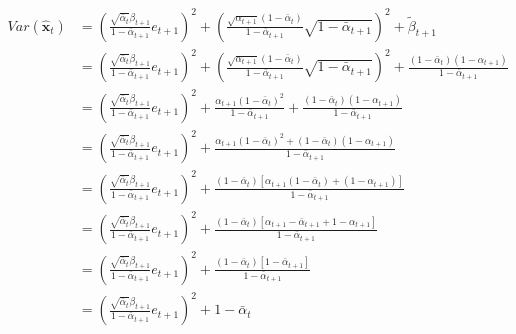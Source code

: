 \documentclass{article} \usepackage{iclr2024_conference,times}
\begin{document}
\begin{align}
Var(\hat{\pmb{x}}_{t}) & = (\frac{\sqrt{\bar{\alpha}_{t}} \beta_{t+1}}{1-\bar{\alpha}_{t+1}} e_{t+1} )^2 + (\frac{\sqrt{\alpha_{t+1}}(1-\bar{\alpha}_{t})}{1-\bar{\alpha}_{t+1}} \sqrt{1 -\bar{\alpha}_{t+1}} )^2 + \tilde{\beta}_{t+1} \label{eq40} \\
& = (\frac{\sqrt{\bar{\alpha}_{t}} \beta_{t+1}}{1-\bar{\alpha}_{t+1}} e_{t+1} )^2 + (\frac{\sqrt{\alpha_{t+1}}(1-\bar{\alpha}_{t})}{1-\bar{\alpha}_{t+1}} \sqrt{1 -\bar{\alpha}_{t+1}} )^2 + \frac{(1-\bar{\alpha}_{t})(1-\alpha_{t+1})} {1-\bar{\alpha}_{t+1}} \nonumber \\
& = (\frac{\sqrt{\bar{\alpha}_{t}} \beta_{t+1}}{1-\bar{\alpha}_{t+1}} e_{t+1} )^2 + \frac{\alpha_{t+1}(1-\bar{\alpha}_{t})^2}{1-\bar{\alpha}_{t+1}} + \frac{(1-\bar{\alpha}_{t})(1-\alpha_{t+1})} {1-\bar{\alpha}_{t+1}} \nonumber \\
& = (\frac{\sqrt{\bar{\alpha}_{t}} \beta_{t+1}}{1-\bar{\alpha}_{t+1}} e_{t+1} )^2 + \frac{\alpha_{t+1}(1-\bar{\alpha}_{t})^2 + (1-\bar{\alpha}_{t})(1-\alpha_{t+1})} {1-\bar{\alpha}_{t+1}} \nonumber \\
& = (\frac{\sqrt{\bar{\alpha}_{t}} \beta_{t+1}}{1-\bar{\alpha}_{t+1}} e_{t+1} )^2 + \frac{(1-\bar{\alpha}_{t})[\alpha_{t+1}(1-\bar{\alpha}_{t}) + (1-\alpha_{t+1})]} {1-\bar{\alpha}_{t+1}} \nonumber \\
& = (\frac{\sqrt{\bar{\alpha}_{t}} \beta_{t+1}}{1-\bar{\alpha}_{t+1}} e_{t+1} )^2 + \frac{(1-\bar{\alpha}_{t})[\alpha_{t+1} - \bar{\alpha}_{t+1} + 1-\alpha_{t+1}]} {1-\bar{\alpha}_{t+1}} \nonumber \\
& = (\frac{\sqrt{\bar{\alpha}_{t}} \beta_{t+1}}{1-\bar{\alpha}_{t+1}} e_{t+1} )^2 + \frac{(1-\bar{\alpha}_{t})[1-\bar{\alpha}_{t+1}]} {1-\bar{\alpha}_{t+1}} \nonumber \\
& = (\frac{\sqrt{\bar{\alpha}_{t}} \beta_{t+1}}{1-\bar{\alpha}_{t+1}} e_{t+1} )^2 + 1-\bar{\alpha}_{t} \label{eq41} \\
\nonumber
\end{align}
\end{document}

